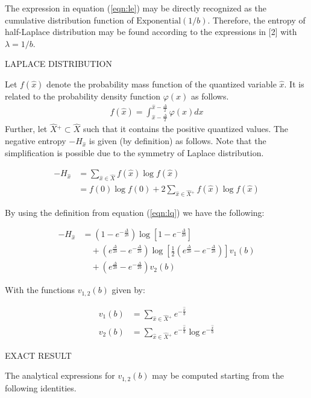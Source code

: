 The expression in equation (\ref{eqn:le}) may be directly recognized as the cumulative distribution function of $\text{Exponential}(1/b)$. Therefore, the entropy of half-Laplace distribution may be found according to the expressions in [2] with $\lambda = 1/b$. 

LAPLACE DISTRIBUTION

Let $f(\hat{x})$ denote the probability mass function of the quantized variable $\hat{x}$. It is related to the probability density function $\varphi(x)$ as follows.
\begin{align} f(\hat{x}) = \int_{\hat{x} - \frac{\Delta}{2}}^{\hat{x} - \frac{\Delta}{2}} \varphi(x) dx \label{eqn:lq} \end{align}
Further, let $\hat{X}{}^+ \subset \hat{X}$ such that it contains the positive quantized values. The negative entropy $-H_{\hat{x}}$ is given (by definition) as follows. Note that the simplification is possible due to the symmetry of Laplace distribution.

\begin{align} -H_{\hat{x}} &= \sum_{\hat{x} \in \hat{X}} f(\hat{x}) \log f(\hat{x}) \\ &= f(0) \log f(0) + 2 \sum_{\hat{x} \in \hat{X}{}^+} f(\hat{x}) \log f(\hat{x}) \end{align}

By using the definition from equation (\ref{eqn:lq}) we have the following:

\begin{align} -H_{\hat{x}} &= \left(1 - e^{-\frac{\Delta}{2b}}\right) \log \left[1 - e^{-\frac{\Delta}{2b}} \right] \nonumber\\ &\quad +  \left(e^{\frac{\Delta}{2b}} - e^{-\frac{\Delta}{2b}}\right) \log \left[ \frac{1}{2} \left(e^{\frac{\Delta}{2b}} - e^{-\frac{\Delta}{2b}}\right) \right] v_1(b) \nonumber\\ &\quad + \left(e^{\frac{\Delta}{2b}} - e^{-\frac{\Delta}{2b}}\right) v_2(b) \end{align}

With the functions $v_{1,2}(b)$ given by:

\begin{align} v_1(b) &= \sum_{\hat{x} \in \hat{X}{}^+} e^{-\frac{\hat{x}}{b}} \\ v_2(b) &= \sum_{\hat{x} \in \hat{X}{}^+} e^{-\frac{\hat{x}}{b}} \log e^{-\frac{\hat{x}}{b}} \end{align}

EXACT RESULT

The analytical expressions for $v_{1,2}(b)$ may be computed starting from the following identities.

